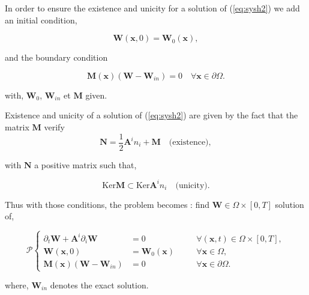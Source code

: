 \documentclass[a4paper,oneside,10pt]{report}
\begin{document}
In order to ensure the existence and unicity for a solution of (\ref{eq:sysh2}) we add an initial condition,

\begin{equation}
\label{eq:ini} 
\mathbf{W}(\mathbf{x},0)=\mathbf{W}_0(\mathbf{x}),
\end{equation}

and the boundary condition

\begin{equation}
\label{eq:bound} 
\mathbf{M}(\mathbf{x})(\mathbf{W}-\mathbf{W}_{in})=0\quad\forall \mathbf{x} \in \partial \Omega.
\end{equation}

with, $\mathbf{W}_0$, $\mathbf{W}_{in}$ et $\mathbf{M}$ given.\newline

Existence and unicity of a solution of (\ref{eq:sysh2})  are given by the fact that the matrix $\mathbf{M}$ verify
\begin{equation}
\label{eq:ctr1}
\mathbf{N} = \frac{1}{2} \mathbf{A}^in_i + \mathbf{M}\quad \mbox{(existence)},
\end{equation}

with $\mathbf{N}$ a positive matrix such that,

\begin{equation}
\label{eq:ctr2}
\mbox{Ker}\mathbf{M} \subset \mbox{Ker}\mathbf{A}^in_i \quad \mbox{(unicity)}.
\end{equation}

Thus with those conditions, the problem becomes : find  $\mathbf{W}\in\Omega \times [0,T]$ solution of,

\begin{equation}
\label{eq:final}
\mathcal{P} \left\{
\begin{aligned}
\partial_t \mathbf{W} +  \mathbf{A}^i\partial_i \mathbf{W} &= 0 &\quad &\forall (\mathbf{x},t) \in \Omega \times [0,T],\\
\mathbf{W}(\mathbf{x},0)&=\mathbf{W}_0(\mathbf{x}) &\quad &\forall \mathbf{x} \in \Omega,\\
\mathbf{M}(\mathbf{x})(\mathbf{W}-\mathbf{W}_{in})&=0&\quad&\forall \mathbf{x} \in \partial\Omega.
\end{aligned}
\right.
\end{equation}

where, $\mathbf{W}_{in}$ denotes the exact solution.
\end{document}
